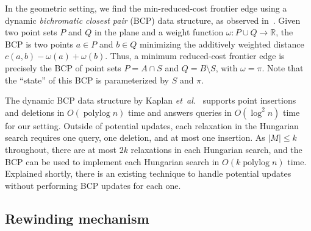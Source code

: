 \documentclass[a4paper,UKenglish]{socg-lipics-v2018}
\makeatletter
\def\etal{\emph{et~al.}}
\def\etal{\textit{et~al.}}
\def\polylog{\mathop{\mathrm{polylog}}}
\def\reals{\mathbb{R}}
\def\abs#1{\mathopen| #1 \mathclose|}		%
\theoremstyle{plain}
\numberwithin{figure}{section}
\def\EMPH#1{\textcolor{BrickRed}{{\emph{#1}}}}
\def\n@te#1{\textsf{\boldmath \textbf{$\langle\!\langle$#1$\rangle\!\rangle$}}\leavevmode}
\def\note#1{\textcolor{red}{\n@te{#1}}}
\makeatother
\begin{document}



In the geometric setting, we find the min-reduced-cost frontier edge using a dynamic
\EMPH{bichromatic closest pair} (BCP) data structure, as observed
in~\cite{AFPVX17,Vaidya89}.
Given two point sets $P$ and $Q$ in the plane and a weight function
$\omega: P\cup Q \to \reals$, the BCP is two points $a \in P$ and $b \in Q$
minimizing the additively weighted distance $c(a, b) - \omega(a) + \omega(b)$.
Thus, a minimum reduced-cost frontier edge is precisely the BCP of point sets
$P = A \cap S$ and $Q = B \setminus S$, with $\omega = \pi$.
Note that the ``state'' of this BCP is parameterized by $S$ and $\pi$.

The dynamic BCP data structure by Kaplan \etal~\cite{KMRSS17} supports point insertions and deletions in
$O(\polylog n)$ time and answers queries in $O(\log^2 n)$ time for our setting.
Outside of potential updates, each relaxation in the Hungarian search requires
one query, one deletion, and at most one insertion.
As $\abs{M} \leq k$ throughout, there are at most $2k$ relaxations in each
Hungarian search, and the BCP can be used to implement each Hungarian search
in $O(k\polylog n)$ time.
Explained shortly, there is an existing technique to handle potential updates
without performing BCP updates for each one.

\subsection{Rewinding mechanism}
\label{SS:rewinding}
\end{document}
